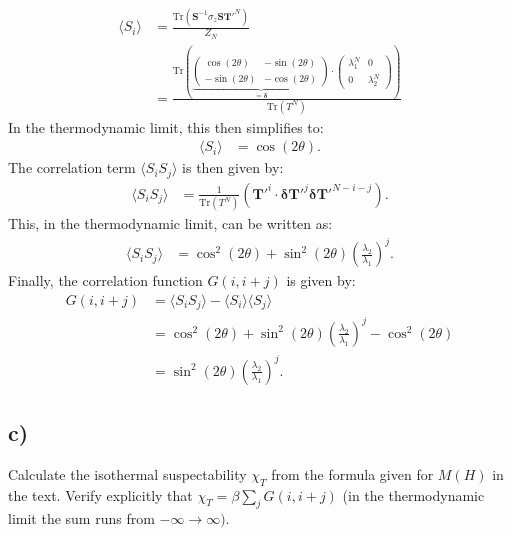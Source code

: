 \documentclass[a4paper]{article}
\newcommand{\trace}{\text{Tr}}
\newcommand{\average}[1]{\langle #1 \rangle}
\begin{document}
\begin{align*}
    \average{S_i} &= \frac{\trace\left(\mathbf{S}^{-1}\sigma_z\mathbf{S}\mathbf{T}'^N\right)}{Z_N}\\
    &= \frac{\trace\left(\underbrace{\begin{pmatrix}
        \cos(2\theta) & -\sin(2\theta)\\
        -\sin(2\theta) &-\cos(2\theta)
    \end{pmatrix}}_{=\mathbf{\delta}}\cdot\begin{pmatrix}
        \lambda_1^N & 0\\
        0 & \lambda_2^N
    \end{pmatrix}\right)}{\trace\left(T^N\right)}
\end{align*}In the thermodynamic limit, this then simplifies to:
\begin{align*}
    \average{S_i} &= \cos(2\theta).
\end{align*}The correlation term $\average{S_iS_j}$ is then given by:
\begin{align*}
    \average{S_iS_j} &= \frac{1}{\trace\left(T^N\right)}\left(\mathbf{T}'^i\cdot \mathbf{\delta}\mathbf{T}'^j\mathbf{\delta}\mathbf{T}'^{N - i - j}\right).
\end{align*}This, in the thermodynamic limit, can be written as:
\begin{align*}
    \average{S_iS_j} &= \cos^2(2\theta) + \sin^2(2\theta)\left(\frac{\lambda_2}{\lambda_1}\right)^j.
\end{align*}Finally, the correlation function $G(i, i + j)$ is given by:
\begin{align*}
    G(i, i + j) &=\average{S_iS_j} - \average{S_i}\average{S_j}\\
    &=\cos^2(2\theta) + \sin^2\left(2\theta\right)\left(\frac{\lambda_2}{\lambda_1}\right)^j - \cos^2\left(2\theta\right)\\
    &= \sin^2\left(2\theta\right)\left(\frac{\lambda_2}{\lambda_1}\right)^j.
\end{align*}

\subsection*{c)}
Calculate the isothermal suspectability $\chi_T$ from the formula given for $M(H)$ in the text.
Verify explicitly that $\chi_T = \beta\sum_j G(i, i+j)$ (in the thermodynamic limit the sum runs from $-\infty\to\infty)$.
\end{document}
